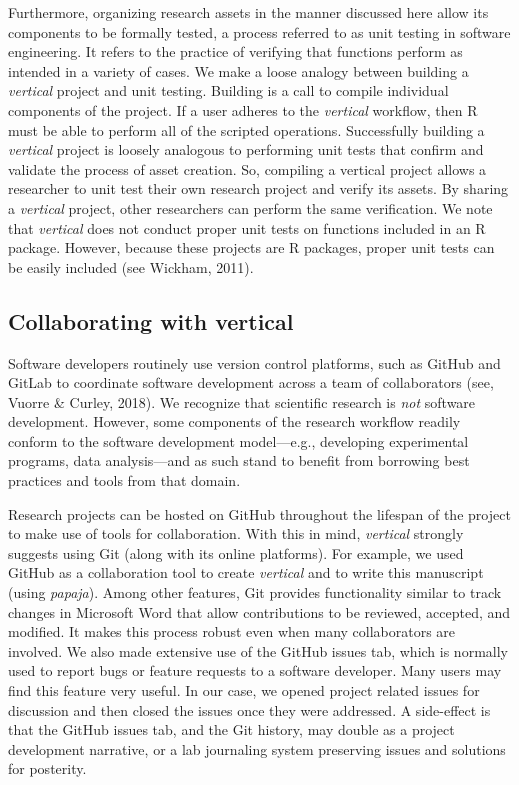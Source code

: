 \documentclass[
  english,
  jou,floatsintext]{apa6}
\begin{document}
Furthermore, organizing research assets in the manner discussed here allow its components to be formally tested, a process referred to as unit testing in software engineering. It refers to the practice of verifying that functions perform as intended in a variety of cases. We make a loose analogy between building a \emph{vertical} project and unit testing. Building is a call to compile individual components of the project. If a user adheres to the \emph{vertical} workflow, then R must be able to perform all of the scripted operations. Successfully building a \emph{vertical} project is loosely analogous to performing unit tests that confirm and validate the process of asset creation. So, compiling a vertical project allows a researcher to unit test their own research project and verify its assets. By sharing a \emph{vertical} project, other researchers can perform the same verification. We note that \emph{vertical} does not conduct proper unit tests on functions included in an R package. However, because these projects are R packages, proper unit tests can be easily included (see Wickham, 2011).

\hypertarget{collaborating-with-vertical}{%
\subsection{Collaborating with vertical}\label{collaborating-with-vertical}}

Software developers routinely use version control platforms, such as GitHub and GitLab to coordinate software development across a team of collaborators (see, Vuorre \& Curley, 2018). We recognize that scientific research is \emph{not} software development. However, some components of the research workflow readily conform to the software development model---e.g., developing experimental programs, data analysis---and as such stand to benefit from borrowing best practices and tools from that domain.

Research projects can be hosted on GitHub throughout the lifespan of the project to make use of tools for collaboration. With this in mind, \emph{vertical} strongly suggests using Git (along with its online platforms). For example, we used GitHub as a collaboration tool to create \emph{vertical} and to write this manuscript (using \emph{papaja}). Among other features, Git provides functionality similar to track changes in Microsoft Word that allow contributions to be reviewed, accepted, and modified. It makes this process robust even when many collaborators are involved. We also made extensive use of the GitHub issues tab, which is normally used to report bugs or feature requests to a software developer. Many users may find this feature very useful. In our case, we opened project related issues for discussion and then closed the issues once they were addressed. A side-effect is that the GitHub issues tab, and the Git history, may double as a project development narrative, or a lab journaling system preserving issues and solutions for posterity.
\end{document}

